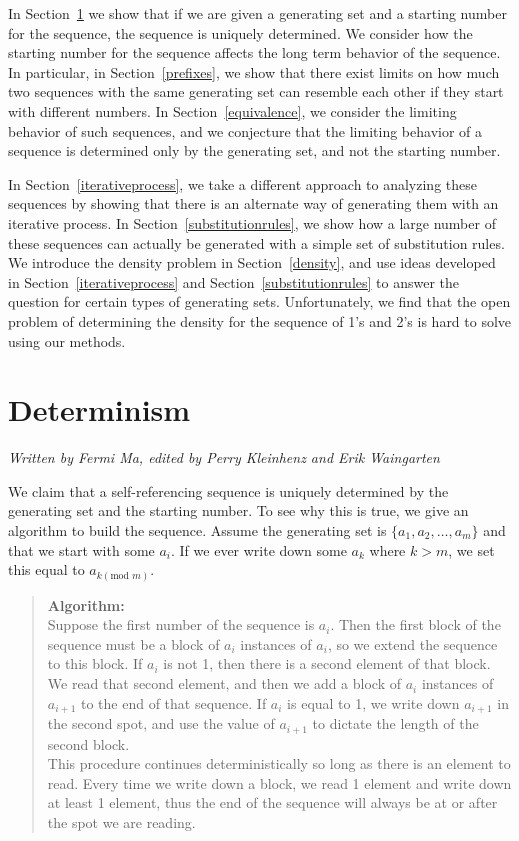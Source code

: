 \documentclass[runningheads,a4paper]{llncs}
\begin{document}
In Section~\ref{determinism} we show that if we are given a generating set and a starting number for the sequence, the sequence is uniquely determined. We consider how the starting number for the sequence affects the long term behavior of the sequence. In particular, in Section~\ref{prefixes}, we show that there exist limits on how much two sequences with the same generating set can resemble each other if they start with different numbers. In Section~\ref{equivalence}, we consider the limiting behavior of such sequences, and we conjecture that the limiting behavior of a sequence is determined only by the generating set, and not the starting number. 

In Section~\ref{iterativeprocess}, we take a different approach to analyzing these sequences by showing that there is an alternate way of generating them with an iterative process. In Section~\ref{substitutionrules}, we show how a large number of these sequences can actually be generated with a simple set of substitution rules. We introduce the density problem in Section~\ref{density}, and use ideas developed in Section~\ref{iterativeprocess} and Section~\ref{substitutionrules} to answer the question for certain types of generating sets. Unfortunately, we find that the open problem of determining the density for the sequence of 1's and 2's is hard to solve using our methods.

\section{Determinism}
\label{determinism}

\emph{Written by Fermi Ma, edited by Perry Kleinhenz and Erik Waingarten}

We claim that a self-referencing sequence is uniquely determined by the generating set and the starting number. To see why this is true, we give an algorithm to build the sequence. Assume the generating set is $\{a_1,a_2,\dots,a_m\}$ and that we start with some $a_i$. If we ever write down some $a_k$ where $k > m$, we set this equal to $a_{k (\text{mod } m)}$.
\begin{quote}
\textbf{Algorithm:}\\
Suppose the first number of the sequence is $a_i$. Then the first block of the sequence must be a block of $a_i$ instances of $a_i$, so we extend the sequence to this block. If $a_i$ is not 1, then there is a second element of that block. We read that second element, and then we add a block of $a_i$ instances of $a_{i+1}$ to the end of that sequence. If $a_i$ is equal to 1, we write down $a_{i+1}$ in the second spot, and use the value of $a_{i+1}$ to dictate the length of the second block.\\

This procedure continues deterministically so long as there is an element to read. Every time we write down a block, we read 1 element and write down at least 1 element, thus the end of the sequence will always be at or after the spot we are reading.
\end{quote}
\end{document}
